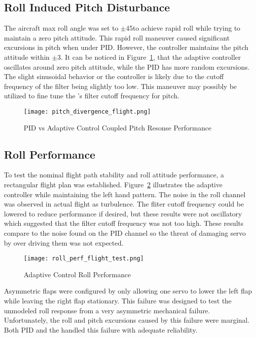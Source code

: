 \subsection{Roll Induced Pitch Disturbance}
The aircraft max roll angle was set to $\pm$45\degrees to achieve rapid roll while trying to maintain a zero pitch attitude.  This rapid roll maneuver caused significant excursions in pitch when under \ac{PID}.  However, the \Lone controller maintains the pitch attitude within $\pm$3\degrees.  It can be noticed in Figure~\ref{fig:pitch_divergence_flight}, that the adaptive controller oscillates around zero pitch attitude, while the \ac{PID} has more random excursions.  The slight sinusoidal behavior or the \Lone controller is likely due to the cutoff frequency of the filter being slightly too low.  This maneuver may possibly be utilized to fine tune the \Lone's filter cutoff frequency for pitch.
\begin{figure}[h!]
 \centering
  \texttt{[image: pitch\_divergence\_flight.png]}
  \caption{PID vs \Lone Adaptive Control Coupled Pitch Resonse Performance}
  \label{fig:pitch_divergence_flight}
\end{figure}

\subsection{Roll Performance}
To test the nominal flight path stability and roll attitude performance, a rectangular flight plan was established.  Figure~\ref{fig:roll_perf_flight_test} illustrates the \Lone adaptive controller while maintaining the left hand pattern.  The noise in the roll channel was observed in actual flight as turbulence.  The fliter cutoff frequency could be lowered to reduce performance if desired, but these results were not oscillatory which suggested that the filter cutoff frequency was not too high.  These results compare to the noise found on the \ac{PID} channel so the threat of damaging servo by over driving them was not expected.
\begin{figure}[h!]
 \centering
  \texttt{[image: roll\_perf\_flight\_test.png]}
  \caption{\Lone Adaptive Control Roll Performance}
  \label{fig:roll_perf_flight_test}
\end{figure}

Asymmetric flaps were configured by only allowing one servo to lower the left flap while leaving the right flap stationary.  This failure was designed to test the unmodeled roll response from a very asymmetric mechanical failure.  Unfortunately, the roll and pitch excursions caused by this failure were marginal.  Both \ac{PID} and the \Lone handled this failure with adequate reliability. 


